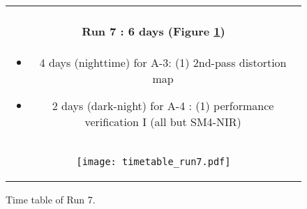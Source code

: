 \begin{figure}[!ht]
\begin{center}
\begin{tabular}{c}
\begin{minipage}{0.95\hsize}
\paragraph{Run 7 : 6 days  (Figure \ref{fig:run7})}
	\begin{itemize}
	\item 4 days (nighttime) for A-3: 
	(1) 2nd-pass distortion map
	\item 2 days (dark-night) for A-4 :
	(1) performance verification I (all but SM4-NIR)
	\end{itemize}
\end{minipage} \\
\begin{minipage}{0.8\hsize}
	\begin{center}
	\vspace*{5mm}
	\texttt{[image: timetable\_run7.pdf]}
	\end{center}
	\vspace*{-5mm}
	\caption{Time table of Run 7.}
	\label{fig:run7}
\end{minipage}
\end{tabular}
\end{center}
\end{figure}

